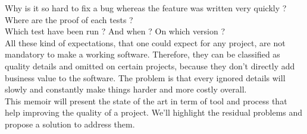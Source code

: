 Why is it so hard to fix a bug whereas the feature was written very quickly ? \\
Where are the proof of each tests ? \\
Which test have been run ?
And when ?
On which version ? \\
\newline
All these kind of expectations, that one could expect for any project, are
not mandatory to make a working software.
Therefore, they can be classified as quality details and omitted on certain
projects, because they don't directly add business value to the software.
The problem is that every ignored details will slowly and constantly make
things harder and more costly overall. \\
\newline
This memoir will present the state of the art in term of tool
and process that help improving the quality of a project.
We'll highlight the residual problems and propose a solution to address them.